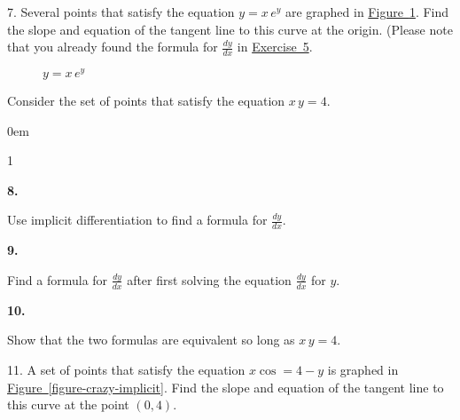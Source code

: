 \documentclass[12pt,]{book}
\theoremstyle{plain}
\theoremstyle{definition}
\numberwithin{equation}{section}
\newenvironment{exercisegroup}%
{\medskip\noindent}%
{\par\bigskip}%
\newlength{\exercisegroupindent}%
\newlength{\exercisegroupitemwidth}%
\newenvironment{exercisegrouplist}%
{\vspace{-\partopsep}%
\begin{adjustwidth}{\exercisegroupindent}{0em}}%
{\end{adjustwidth}%
\vspace{-\partopsep}%
\vspace{\baselineskip}}%
\newenvironment{exercisegroupbycol}[1]%
{\begin{exercisegrouplist}%
\vspace{-\multicolsep}%
\begin{multicols}{#1}%
\setlength{\parindent}{0em}%
\setlength{\exercisegroupitemwidth}{\linewidth}}%
{\end{multicols}%
\vspace{-\multicolsep}%
\end{exercisegrouplist}}%
\newenvironment{exercisegroupitem}[1]%
{\begin{minipage}[t]{\exercisegroupitemwidth}
\vspace{0pt}%
{\bfseries#1}%
\rule{0pt}{\baselineskip}}{\strut%
\end{minipage}%
\hspace{\columnsep}}%
\providecommand\phantomsection{}
\newcommand{\fe}[2]{\mathop{{#1}{\left(#2\right)}}}
\newcommand{\point}[2]{\left(#1,#2\right)}
\newcommand{\lz}[2]{\frac{d#1}{d#2}}
\begin{document}
\begin{exerciselist}
\item[7.]\phantomsection\hypertarget{exercise-384}{\null}Several points that satisfy the equation \(y=x\,e^y\) are graphed in \hyperref[figure-lambert]{Figure~\ref*{figure-lambert}}.  Find the slope and equation of the tangent line to this curve at the origin.  (Please note that you already found the formula for \(\lz{y}{x}\) in \hyperref[exercise-implicit-lambert]{Exercise~5}.%
\begin{figure}
\centering
{
}
\caption{\(y=x\,e^y\)\label{figure-lambert}}
\end{figure}
\par\smallskip
\begin{exercisegroup}%
Consider the set of points that satisfy the equation \(x\,y=4\).%
\par
\begin{exercisegroupbycol}{1}%
\begin{exercisegroupitem}{8. }\phantomsection\hypertarget{exercise-385}{\null}
Use implicit differentiation to find a formula for \(\lz{y}{x}\).%
\end{exercisegroupitem}%
\par%
\begin{exercisegroupitem}{9. }\phantomsection\hypertarget{exercise-386}{\null}
Find a formula for \(\lz{y}{x}\) after first solving the equation \(\lz{y}{x}\) for \(y\).%
\end{exercisegroupitem}%
\par%
\begin{exercisegroupitem}{10. }\phantomsection\hypertarget{exercise-387}{\null}
Show that the two formulas are equivalent so long as \(x\,y=4\).%
\end{exercisegroupitem}%
\par%
\end{exercisegroupbycol}%
\end{exercisegroup}%
\item[11.]\phantomsection\hypertarget{exercise-388}{\null}A set of points that satisfy the equation \(x\fe{\cos}{xy}=4-y\) is graphed in \hyperref[figure-crazy-implicit]{Figure~\ref*{figure-crazy-implicit}}.  Find the slope and equation of the tangent line to this curve at the point \(\point{0}{4}\).%

\end{exerciselist}
\end{document}
